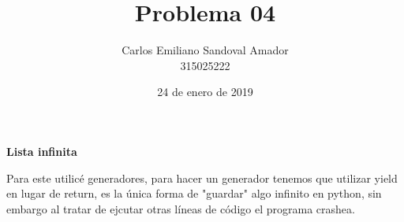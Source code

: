 \documentclass[letterpaper, 12pt, oneside]{article}%
\title{Problema 04}
\author{Carlos Emiliano Sandoval Amador \\ 315025222}
\date{24 de enero de 2019}
\begin{document}
	\maketitle
	\begin{center}
		\textbf{\large Lista infinita}
	\end{center}
	Para este utilicé generadores, para hacer un generador tenemos que utilizar yield en lugar de return, es la única forma de "guardar" algo infinito en python, sin embargo al tratar de ejcutar otras líneas de código el programa crashea.
\end{document}
